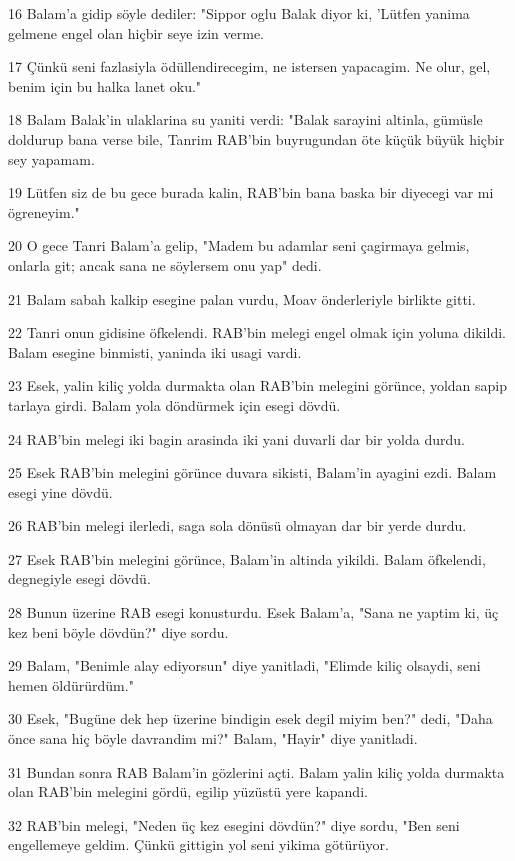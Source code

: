 \par 16 Balam'a gidip söyle dediler: "Sippor oglu Balak diyor ki, 'Lütfen yanima gelmene engel olan hiçbir seye izin verme.
\par 17 Çünkü seni fazlasiyla ödüllendirecegim, ne istersen yapacagim. Ne olur, gel, benim için bu halka lanet oku."
\par 18 Balam Balak'in ulaklarina su yaniti verdi: "Balak sarayini altinla, gümüsle doldurup bana verse bile, Tanrim RAB'bin buyrugundan öte küçük büyük hiçbir sey yapamam.
\par 19 Lütfen siz de bu gece burada kalin, RAB'bin bana baska bir diyecegi var mi ögreneyim."
\par 20 O gece Tanri Balam'a gelip, "Madem bu adamlar seni çagirmaya gelmis, onlarla git; ancak sana ne söylersem onu yap" dedi.
\par 21 Balam sabah kalkip esegine palan vurdu, Moav önderleriyle birlikte gitti.
\par 22 Tanri onun gidisine öfkelendi. RAB'bin melegi engel olmak için yoluna dikildi. Balam esegine binmisti, yaninda iki usagi vardi.
\par 23 Esek, yalin kiliç yolda durmakta olan RAB'bin melegini görünce, yoldan sapip tarlaya girdi. Balam yola döndürmek için esegi dövdü.
\par 24 RAB'bin melegi iki bagin arasinda iki yani duvarli dar bir yolda durdu.
\par 25 Esek RAB'bin melegini görünce duvara sikisti, Balam'in ayagini ezdi. Balam esegi yine dövdü.
\par 26 RAB'bin melegi ilerledi, saga sola dönüsü olmayan dar bir yerde durdu.
\par 27 Esek RAB'bin melegini görünce, Balam'in altinda yikildi. Balam öfkelendi, degnegiyle esegi dövdü.
\par 28 Bunun üzerine RAB esegi konusturdu. Esek Balam'a, "Sana ne yaptim ki, üç kez beni böyle dövdün?" diye sordu.
\par 29 Balam, "Benimle alay ediyorsun" diye yanitladi, "Elimde kiliç olsaydi, seni hemen öldürürdüm."
\par 30 Esek, "Bugüne dek hep üzerine bindigin esek degil miyim ben?" dedi, "Daha önce sana hiç böyle davrandim mi?" Balam, "Hayir" diye yanitladi.
\par 31 Bundan sonra RAB Balam'in gözlerini açti. Balam yalin kiliç yolda durmakta olan RAB'bin melegini gördü, egilip yüzüstü yere kapandi.
\par 32 RAB'bin melegi, "Neden üç kez esegini dövdün?" diye sordu, "Ben seni engellemeye geldim. Çünkü gittigin yol seni yikima götürüyor.
